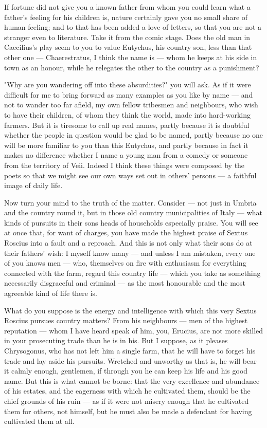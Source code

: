  If fortune did not give you a known father from whom you could learn what a father's feeling for his children is, nature certainly gave you no small share of human feeling; and to that has been added a love of letters, so that you are not a stranger even to literature. Take it from the comic stage. Does the old man in Caecilius's play seem to you to value Eutychus, his country son, less than that other one --- Chaerestratus, I think the name is --- whom he keeps at his side in town as an honour, while he relegates the other to the country as a punishment?

 "Why are you wandering off into these absurdities?" you will ask. As if it were difficult for me to bring forward as many examples as you like by name --- and not to wander too far afield, my own fellow tribesmen and neighbours, who wish to have their children, of whom they think the world, made into hard-working farmers. But it is tiresome to call up real names, partly because it is doubtful whether the people in question would be glad to be named, partly because no one will be more familiar to you than this Eutychus, and partly because in fact it makes no difference whether I name a young man from a comedy or someone from the territory of Veii. Indeed I think these things were composed by the poets so that we might see our own ways set out in others' persons --- a faithful image of daily life.

 Now turn your mind to the truth of the matter. Consider --- not just in Umbria and the country round it, but in those old country municipalities of Italy --- what kinds of pursuits in their sons heads of households especially praise. You will see at once that, for want of charges, you have made the highest praise of Sextus Roscius into a fault and a reproach. And this is not only what their sons do at their fathers' wish: I myself know many --- and unless I am mistaken, every one of you knows men --- who, themselves on fire with enthusiasm for everything connected with the farm, regard this country life --- which you take as something necessarily disgraceful and criminal --- as the most honourable and the most agreeable kind of life there is.

 What do you suppose is the energy and intelligence with which this very Sextus Roscius pursues country matters? From his neighbours --- men of the highest reputation --- whom I have heard speak of him, you, Erucius, are not more skilled in your prosecuting trade than he is in his. But I suppose, as it pleases Chrysogonus, who has not left him a single farm, that he will have to forget his trade and lay aside his pursuits. Wretched and unworthy as that is, he will bear it calmly enough, gentlemen, if through you he can keep his life and his good name. But this is what cannot be borne: that the very excellence and abundance of his estates, and the eagerness with which he cultivated them, should be the chief grounds of his ruin --- as if it were not misery enough that he cultivated them for others, not himself, but he must also be made a defendant for having cultivated them at all.

